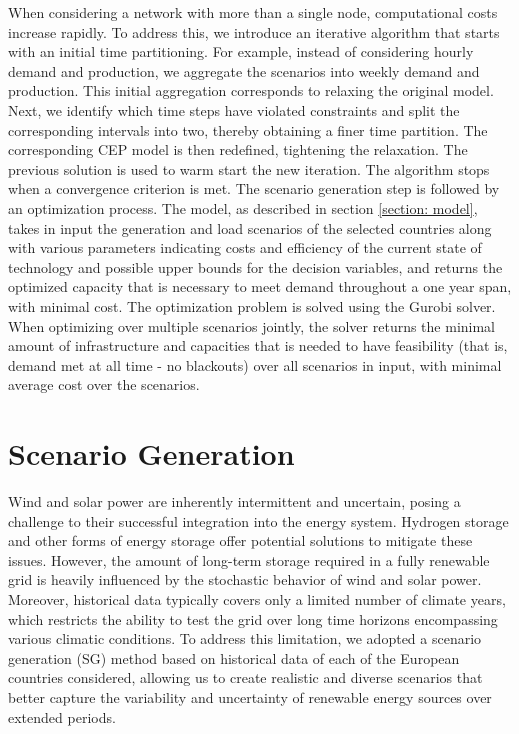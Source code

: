\documentclass[english]{article}
\numberwithin{definition}{section}
\numberwithin{theorem}{section}
\numberwithin{problem}{section}
\begin{document}
When considering a network with more than a single node, computational costs increase rapidly. To address this, we introduce an iterative algorithm that starts with an initial time partitioning. For example, instead of considering hourly demand and production, we aggregate the scenarios into weekly demand and production. This initial aggregation corresponds to relaxing the original model. Next, we identify which time steps have violated constraints and split the corresponding intervals into two, thereby obtaining a finer time partition. The corresponding CEP model is then redefined, tightening the relaxation. The previous solution is used to warm start the new iteration. The algorithm stops when a convergence criterion is met.
The scenario generation step is followed by an optimization process. The model, as described in section \ref{section: model}, takes in input the generation and load scenarios of the selected countries along with various parameters indicating costs and efficiency of the current state of technology and possible upper bounds for the decision variables, and returns the optimized capacity that is necessary to meet demand throughout a one year span, with minimal cost. The optimization problem is solved using the Gurobi solver.
When optimizing over multiple scenarios jointly, the solver returns the minimal amount of infrastructure and capacities that is needed to have feasibility (that is, demand met at all time - no blackouts) over all scenarios in input, with minimal average cost over the scenarios.




\section{Scenario Generation}

Wind and solar power are inherently intermittent and uncertain, posing a challenge to their successful integration into the energy system. Hydrogen storage and other forms of energy storage offer potential solutions to mitigate these issues. However, the amount of long-term storage required in a fully renewable grid is heavily influenced by the stochastic behavior of wind and solar power. Moreover, historical data typically covers only a limited number of climate years, which restricts the ability to test the grid over long time horizons encompassing various climatic conditions. To address this limitation, we adopted a scenario generation (SG) method based on historical data of each of the European countries considered, allowing us to create realistic and diverse scenarios that better capture the variability and uncertainty of renewable energy sources over extended periods. 
\end{document}
